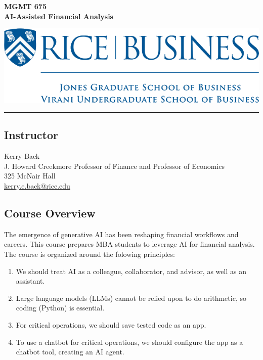 \documentclass[11pt]{article}
\begin{document}
\begin{minipage}[c][3cm][c]{0.5\textwidth}
\Large\textbf{MGMT 675\\ AI-Assisted Financial Analysis}
\end{minipage}
\hfill
\begin{minipage}[c][3cm][c]{0.4\textwidth}
\includegraphics[width=\textwidth]{images/rice-business-transparent-final.png}
\end{minipage}

\vspace{0.5cm}
\hrule

\subsection*{Instructor}
Kerry Back\\
J. Howard Creekmore Professor of Finance and Professor of Economics\\
325 McNair Hall\\
\href{mailto:kerry.e.back@rice.edu}{kerry.e.back@rice.edu}

\subsection*{Course Overview}

The emergence of generative AI has been reshaping financial workflows and careers. This course prepares MBA students to leverage AI for financial analysis.  The course is organized around the folowing principles:

\begin{enumerate}
\item We should treat AI as a colleague, collaborator, and advisor, as well as an assistant. 
\item Large language models (LLMs) cannot be relied upon to do arithmetic, so coding (Python) is essential. 
\item For critical operations, we should save tested code as an app.
\item To use a chatbot for critical operations, we should configure the app as a chatbot tool, creating an AI agent.
\end{enumerate}
\end{document}
